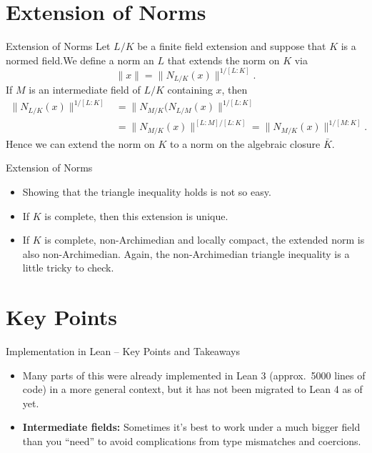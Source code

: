 \documentclass{beamer}
\begin{document}
\section{Extension of Norms}
\begin{frame}{Extension of Norms}
    Let $L/K$ be a finite field extension and suppose that $K$ is a normed field.\pause We define a norm an $L$ that extends the norm on $K$ via 
    \begin{equation*}
        \|x\| = \|N_{L/K}(x)\|^{1/[L : K]}.
    \end{equation*}
    \pause 
    If $M$ is an intermediate field of $L/K$ containing $x$, then 
    \begin{align*}
        \|N_{L/K}(x)\|^{1/[L : K]} &= \|N_{M/K}(N_{L/M}(x)\|^{1/[L : K]} \\ &= \|N_{M/K}(x)\|^{[L : M]/[L : K]} = \|N_{M/K}(x)\|^{1/[M : K]}.
    \end{align*}
    \pause 
    Hence we can extend the norm on $K$ to a norm on the algebraic closure $\bar{K}$.
\end{frame}

\begin{frame}{Extension of Norms}
    \begin{itemize}
        \item Showing that the triangle inequality holds is not so easy.
        \pause 
        \item If $K$ is complete, then this extension is unique. 
        \pause 
        \item If $K$ is complete, non-Archimedian and locally compact, the extended norm is also non-Archimedian. Again, the non-Archimedian triangle inequality is a little tricky to check.
    \end{itemize}
\end{frame}

\section{Key Points}
\begin{frame}{Implementation in Lean – Key Points and Takeaways}

\begin{itemize}
    \item Many parts of this were already implemented in Lean 3 (approx.\ 5000 lines of code) in a more general context, but it has not been migrated to Lean 4 as of yet.
    
    \item \textbf{Intermediate fields:} Sometimes it's best to work under a much bigger field than you “need” to avoid complications from type mismatches and coercions.
\end{itemize}

\end{frame}
\end{document}
